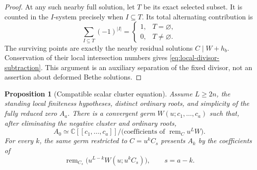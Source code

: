 \documentclass[11pt]{article}
\newtheorem{proposition}{Proposition}[section]
\theoremstyle{definition}
\newcommand{\C}{\mathbb C}
\begin{document}
\begin{proof}
At any such nearby full solution, let $T$ be its exact selected subset.
It is counted in the $I$-system precisely when $I\subseteq T$.
Its total alternating contribution is
\[
 \sum_{I\subseteq T}(-1)^{|I|}
 =\begin{cases}1,&T=\varnothing,\\0,&T\ne\varnothing.\end{cases}
\]
The surviving points are exactly the nearby residual solutions
$C\mid W+h_b$. Conservation of their local intersection numbers gives
\eqref{eq:local-divisor-subtraction}. This argument is an auxiliary
separation of the fixed divisor, not an assertion about deformed Bethe
solutions.
\end{proof}

\begin{proposition}[Compatible scalar cluster equation]
\label{prop:scalar-cluster-equation}
Assume $L\ge2n$, the standing local finiteness hypotheses, distinct
ordinary roots, and simplicity of the fully reduced zero $A_a$.
There is a convergent germ $W(u;c_1,\ldots,c_a)$ such that, after
eliminating the negative cluster and ordinary roots,
\begin{equation}\label{eq:scalar-full-cluster}
 A_0\simeq\C[[c_1,\ldots,c_a]]/
       \bigl(\text{coefficients of }\operatorname{rem}_C u^LW\bigr).
\end{equation}
For every $k$, the same germ restricted to $C=u^kC_s$ presents $A_k$
by the coefficients of
\begin{equation}\label{eq:scalar-reduced-cluster}
 \operatorname{rem}_{C_s}
          \bigl(u^{L-k}W(u;u^kC_s)\bigr),\qquad s=a-k.
\end{equation}
\end{proposition}
\end{document}
